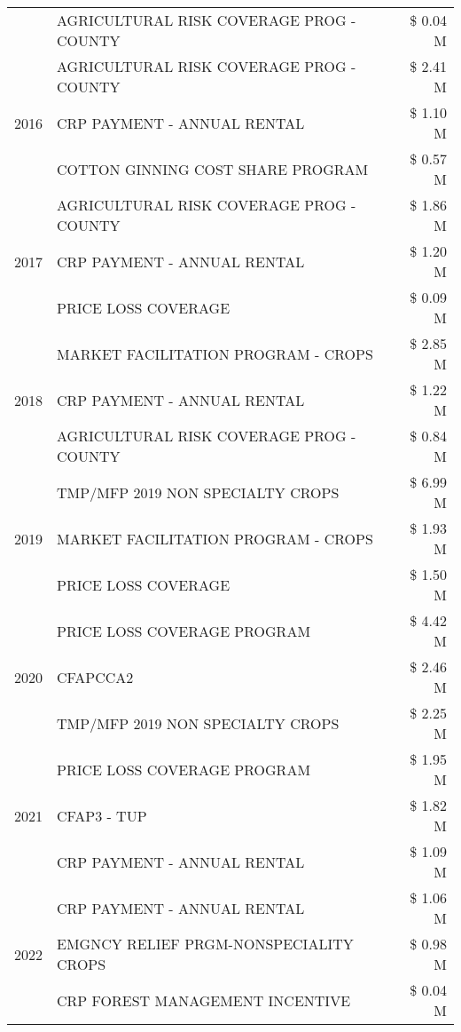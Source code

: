 \begin{tabular}{llr}
 & AGRICULTURAL RISK COVERAGE PROG - COUNTY & \$ 0.04 M \\
\cline{1-3}
\multirow[t]{3}{*}{2016} & AGRICULTURAL RISK COVERAGE PROG - COUNTY & \$ 2.41 M \\
 & CRP PAYMENT - ANNUAL RENTAL & \$ 1.10 M \\
 & COTTON GINNING COST SHARE PROGRAM & \$ 0.57 M \\
\cline{1-3}
\multirow[t]{3}{*}{2017} & AGRICULTURAL RISK COVERAGE PROG - COUNTY & \$ 1.86 M \\
 & CRP PAYMENT - ANNUAL RENTAL & \$ 1.20 M \\
 & PRICE LOSS COVERAGE & \$ 0.09 M \\
\cline{1-3}
\multirow[t]{3}{*}{2018} & MARKET FACILITATION PROGRAM - CROPS & \$ 2.85 M \\
 & CRP PAYMENT - ANNUAL RENTAL & \$ 1.22 M \\
 & AGRICULTURAL RISK COVERAGE PROG - COUNTY & \$ 0.84 M \\
\cline{1-3}
\multirow[t]{3}{*}{2019} & TMP/MFP 2019 NON SPECIALTY CROPS & \$ 6.99 M \\
 & MARKET FACILITATION PROGRAM - CROPS & \$ 1.93 M \\
 & PRICE LOSS COVERAGE & \$ 1.50 M \\
\cline{1-3}
\multirow[t]{3}{*}{2020} & PRICE LOSS COVERAGE PROGRAM & \$ 4.42 M \\
 & CFAPCCA2 & \$ 2.46 M \\
 & TMP/MFP 2019 NON SPECIALTY CROPS & \$ 2.25 M \\
\cline{1-3}
\multirow[t]{3}{*}{2021} & PRICE LOSS COVERAGE PROGRAM & \$ 1.95 M \\
 & CFAP3 - TUP & \$ 1.82 M \\
 & CRP PAYMENT - ANNUAL RENTAL & \$ 1.09 M \\
\cline{1-3}
\multirow[t]{3}{*}{2022} & CRP PAYMENT - ANNUAL RENTAL & \$ 1.06 M \\
 & EMGNCY RELIEF PRGM-NONSPECIALITY CROPS & \$ 0.98 M \\
 & CRP FOREST MANAGEMENT INCENTIVE & \$ 0.04 M \\
\cline{1-3}
\bottomrule
\end{tabular}
